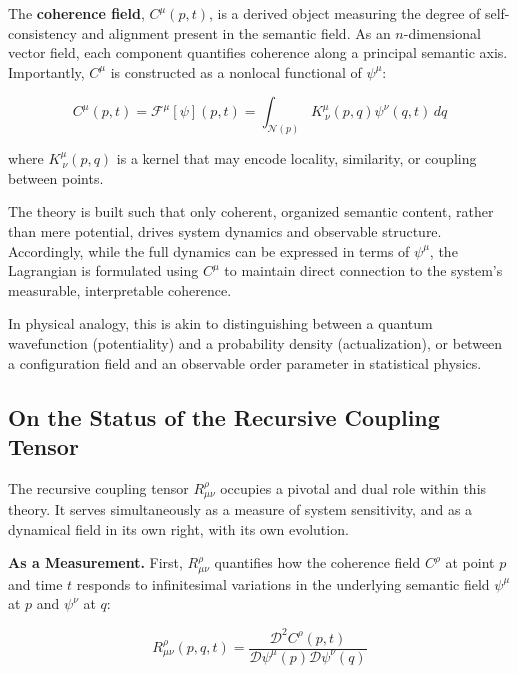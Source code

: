 The \textbf{coherence field}, \(C^\mu(p,t)\), is a derived object measuring the degree of self-consistency and alignment present in the semantic field. As an \(n\)-dimensional vector field, each component quantifies coherence along a principal semantic axis. Importantly, \(C^\mu\) is constructed as a nonlocal functional of \(\psi^\mu\):

\begin{equation}
C^\mu(p,t) = \mathcal{F}^\mu[\psi](p,t) = \int_{\mathcal{N}(p)} K^\mu_{\ \nu}(p,q) \psi^\nu(q,t) \, dq
\end{equation}

where \(K^\mu_{\ \nu}(p,q)\) is a kernel that may encode locality, similarity, or coupling between points.

The theory is built such that only coherent, organized semantic content, rather than mere potential, drives system dynamics and observable structure. Accordingly, while the full dynamics can be expressed in terms of \(\psi^\mu\), the Lagrangian is formulated using \(C^\mu\) to maintain direct connection to the system's measurable, interpretable coherence.

In physical analogy, this is akin to distinguishing between a quantum wavefunction (potentiality) and a probability density (actualization), or between a configuration field and an observable order parameter in statistical physics.


\subsection{On the Status of the Recursive Coupling Tensor}
\label{2.4.7:on_the_status_of_the_recursive_coupling_tensor}

The recursive coupling tensor \(R^\rho_{\mu\nu}\) occupies a pivotal and dual role within this theory. It serves simultaneously as a measure of system sensitivity, and as a dynamical field in its own right, with its own evolution.

\textbf{As a Measurement.} First, \(R^\rho_{\mu\nu}\) quantifies how the coherence field \(C^\rho\) at point \(p\) and time \(t\) responds to infinitesimal variations in the underlying semantic field \(\psi^\mu\) at \(p\) and \(\psi^\nu\) at \(q\):

\begin{equation}
\label{eq:R_measurement}
R^\rho_{\mu\nu}(p, q, t) = \frac{\mathcal{D}^2 C^\rho(p, t)}{\mathcal{D} \psi^\mu(p) \mathcal{D} \psi^\nu(q)}
\end{equation}

